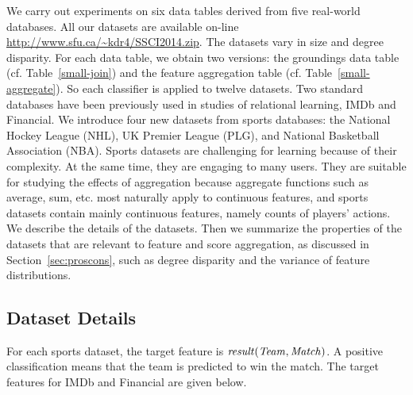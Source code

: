 \documentclass[conference]{IEEEtran}
\begin{document}


We carry out experiments on six data tables derived from five real-world databases. All our datasets are available on-line \url{http://www.sfu.ca/~kdr4/SSCI2014.zip}. The datasets vary in size and degree disparity. For each data table, we obtain two versions: the groundings data table (cf. Table~\ref{small-join}) and the feature aggregation table (cf.
Table~\ref{small-aggregate}). So each classifier is applied to twelve datasets.
Two standard databases  have been previously used in studies of relational learning, IMDb and Financial. We introduce four new datasets from sports databases: the National Hockey League (NHL), UK Premier League (PLG), and National Basketball Association (NBA). Sports datasets are challenging for learning because of their complexity. At the same time, they are engaging to many users. They are suitable for studying the effects of aggregation because aggregate functions such as average, sum, etc. most naturally apply to continuous features, and sports datasets contain mainly continuous features, namely counts of players' actions. We describe the details of the datasets. Then we summarize the properties of the datasets that are relevant to feature and score aggregation, as discussed in Section~\ref{sec:proscons}, such as degree disparity and the variance of feature distributions.

\subsection{Dataset Details}

For each sports dataset, the target feature is $\it{result(Team,Match)}$. A positive classification means that the team is predicted to win the match. The target features for IMDb and Financial are given below.
\end{document}

